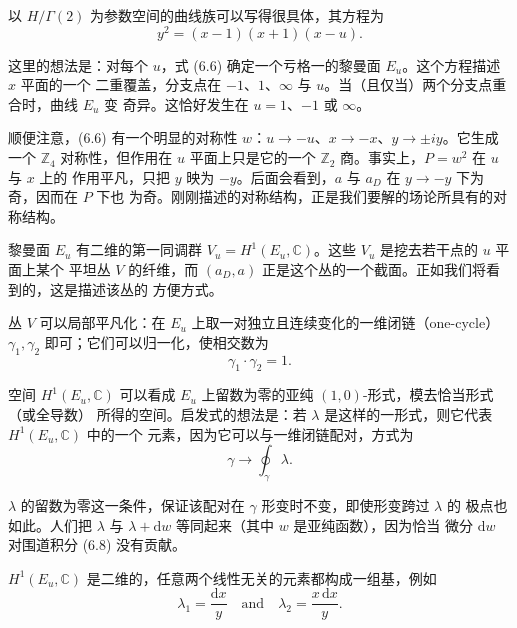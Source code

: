 \documentclass[11pt,a4paper,UTF8,fontset=fandol]{ctexart}
\theoremstyle{plain}
\theoremstyle{definition}
\newcommand{\C}{\mathbb{C}}
\newcommand{\Z}{\mathbb{Z}}
\newcommand{\dd}{\mathrm{d}}
\begin{document}
以 $H/\Gamma(2)$ 为参数空间的曲线族可以写得很具体，其方程为
\begin{equation}
  y^2=(x-1)(x+1)(x-u). \tag{6.6}
\end{equation}

这里的想法是：对每个 $u$，式 (6.6) 确定一个亏格一的黎曼面 $E_u$。这个方程描述 $x$ 平面的一个
二重覆盖，分支点在 $-1$、$1$、$\infty$ 与 $u$。当（且仅当）两个分支点重合时，曲线 $E_u$ 变
奇异。这恰好发生在 $u=1$、$-1$ 或 $\infty$。

顺便注意，(6.6) 有一个明显的对称性 $w$：$u\to-u$、$x\to-x$、$y\to\pm iy$。它生成一个
$\Z_4$ 对称性，但作用在 $u$ 平面上只是它的一个 $\Z_2$ 商。事实上，$P=w^2$ 在 $u$ 与 $x$ 上的
作用平凡，只把 $y$ 映为 $-y$。后面会看到，$a$ 与 $a_D$ 在 $y\to-y$ 下为奇，因而在 $P$ 下也
为奇。刚刚描述的对称结构，正是我们要解的场论所具有的对称结构。

黎曼面 $E_u$ 有二维的第一同调群 $V_u=H^1(E_u,\C)$。这些 $V_u$ 是挖去若干点的 $u$ 平面上某个
平坦丛 $V$ 的纤维，而 $(a_D,a)$ 正是这个丛的一个截面。正如我们将看到的，这是描述该丛的
方便方式。

丛 $V$ 可以局部平凡化：在 $E_u$ 上取一对独立且连续变化的一维闭链（one-cycle）
$\gamma_1,\gamma_2$ 即可；它们可以归一化，使相交数为
\begin{equation}
  \gamma_1\cdot\gamma_2=1. \tag{6.7}
\end{equation}

空间 $H^1(E_u,\C)$ 可以看成 $E_u$ 上留数为零的亚纯 $(1,0)$-形式，模去恰当形式（或全导数）
所得的空间。启发式的想法是：若 $\lambda$ 是这样的一形式，则它代表 $H^1(E_u,\C)$ 中的一个
元素，因为它可以与一维闭链配对，方式为
\begin{equation}
  \gamma\to\oint_\gamma\lambda. \tag{6.8}
\end{equation}

$\lambda$ 的留数为零这一条件，保证该配对在 $\gamma$ 形变时不变，即使形变跨过 $\lambda$ 的
极点也如此。人们把 $\lambda$ 与 $\lambda+\dd w$ 等同起来（其中 $w$ 是亚纯函数），因为恰当
微分 $\dd w$ 对围道积分 (6.8) 没有贡献。

$H^1(E_u,\C)$ 是二维的，任意两个线性无关的元素都构成一组基，例如
\begin{equation}
  \lambda_1=\frac{\dd x}{y}\quad\text{and}\quad \lambda_2=\frac{x\,\dd x}{y}. \tag{6.9}
\end{equation}
\end{document}

